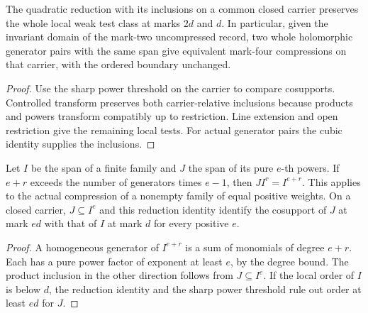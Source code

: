 \begin{theorem}
\label{hir:g1-two-vertex-proper-quadratic-weak-class}
\leanok
The quadratic reduction with its inclusions on a common closed
carrier preserves the whole local weak test class at marks $2d$
and $d$. In particular, given the invariant domain of the mark-two
uncompressed record, two whole holomorphic generator pairs with
the same span give equivalent mark-four compressions on that carrier,
with the ordered boundary unchanged.
\end{theorem}
\begin{proof}
Use the sharp power threshold on the carrier to compare cosupports.
Controlled transform preserves both carrier-relative inclusions
because products and powers transform compatibly up to restriction.
Line extension and open restriction give the remaining local tests.
For actual generator pairs the cubic identity supplies the
inclusions.
\end{proof}

\begin{theorem}
\label{hir:g1-uniform-weight-power-reduction}
\leanok
Let $I$ be the span of a finite family and $J$ the span of its
pure $e$-th powers. If $e+r$ exceeds the number of generators
times $e-1$, then $JI^r=I^{e+r}$. This applies to the
actual compression of a nonempty family of equal positive weights.
On a closed carrier, $J\subseteq I^e$ and this reduction identity
identify the cosupport of $J$ at mark $ed$ with that of $I$ at mark
$d$ for every positive $e$.
\end{theorem}
\begin{proof}
A homogeneous generator of $I^{e+r}$ is a sum of monomials of
degree $e+r$. Each has a pure power factor of exponent at least
$e$, by the degree bound. The product inclusion in the other
direction follows from $J\subseteq I^e$. If the local order of
$I$ is below $d$, the reduction identity and the sharp power
threshold rule out order at least $ed$ for $J$.
\end{proof}

